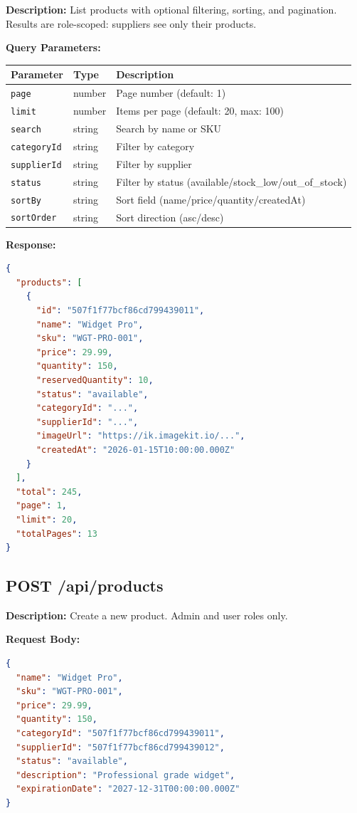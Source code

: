 ﻿\documentclass[12pt,a4paper]{report}
\begin{document}
\textbf{Description:} List products with optional filtering, sorting, and pagination. Results are role-scoped: suppliers see only their products.

\textbf{Query Parameters:}
\begin{center}
\begin{tabularx}{\textwidth}{llX}
  \toprule
  \textbf{Parameter} & \textbf{Type} & \textbf{Description} \\
  \midrule
  \texttt{page}       & number  & Page number (default: 1) \\
  \texttt{limit}      & number  & Items per page (default: 20, max: 100) \\
  \texttt{search}     & string  & Search by name or SKU \\
  \texttt{categoryId} & string  & Filter by category \\
  \texttt{supplierId} & string  & Filter by supplier \\
  \texttt{status}     & string  & Filter by status (available/stock\_low/out\_of\_stock) \\
  \texttt{sortBy}     & string  & Sort field (name/price/quantity/createdAt) \\
  \texttt{sortOrder}  & string  & Sort direction (asc/desc) \\
  \bottomrule
\end{tabularx}
\end{center}

\textbf{Response:}
\begin{lstlisting}[language=JSON,caption={Products list response}]
{
  "products": [
    {
      "id": "507f1f77bcf86cd799439011",
      "name": "Widget Pro",
      "sku": "WGT-PRO-001",
      "price": 29.99,
      "quantity": 150,
      "reservedQuantity": 10,
      "status": "available",
      "categoryId": "...",
      "supplierId": "...",
      "imageUrl": "https://ik.imagekit.io/...",
      "createdAt": "2026-01-15T10:00:00.000Z"
    }
  ],
  "total": 245,
  "page": 1,
  "limit": 20,
  "totalPages": 13
}
\end{lstlisting}

\subsection{POST /api/products}

\textbf{Description:} Create a new product. Admin and user roles only.

\textbf{Request Body:}
\begin{lstlisting}[language=JSON,caption={Create product request body}]
{
  "name": "Widget Pro",
  "sku": "WGT-PRO-001",
  "price": 29.99,
  "quantity": 150,
  "categoryId": "507f1f77bcf86cd799439011",
  "supplierId": "507f1f77bcf86cd799439012",
  "status": "available",
  "description": "Professional grade widget",
  "expirationDate": "2027-12-31T00:00:00.000Z"
}
\end{lstlisting}
\end{document}
